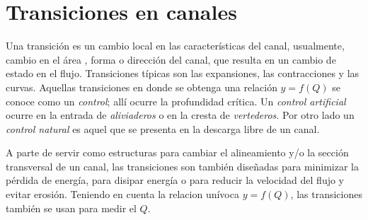 \documentclass[11pt, oneside]{article}
\begin{document}
\section{Transiciones en canales}

Una transici\'on es un cambio local en las caracter\'isticas del canal, usualmente, cambio en el \'area , forma o direcci\'on del canal, que resulta en un cambio de estado en el flujo. Transiciones t\'ipicas son las expansiones, las contracciones y las curvas. Aquellas transiciones en donde se obtenga una relaci\'on $y=f(Q)$ se conoce como un \emph{control}; all\'i ocurre la profundidad cr\'itica. Un \emph{control artificial} ocurre en  la entrada de \emph{aliviaderos} o en la cresta de \emph{vertederos}. Por otro lado un \emph{control natural} es aquel que se presenta en la descarga libre de un canal. 

A parte de servir como estructuras para cambiar el alineamiento y/o la secci\'on transversal de un canal, las transiciones son tambi\'en diseñadas para minimizar la p\'erdida de energ\'ia, para disipar energ\'ia o para reducir la velocidad del flujo y evitar erosi\'on. Teniendo en cuenta la relacion un\'ivoca $y=f(Q)$, las transiciones tambi\'en se usan para medir el $Q$. 
\end{document}
